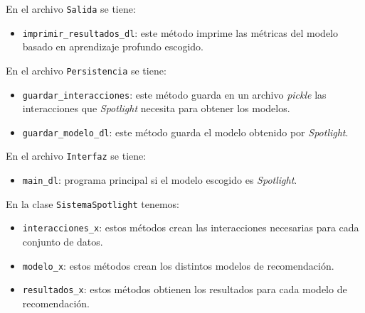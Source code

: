 En el archivo \texttt{Salida} se tiene:
\begin{itemize}
\tightlist
\item \texttt{imprimir\_resultados\_dl}: este método imprime las métricas del modelo basado en aprendizaje profundo escogido.
\end{itemize}

En el archivo \texttt{Persistencia} se tiene:
\begin{itemize}
\tightlist
\item \texttt{guardar\_interacciones}: este método guarda en un archivo \textit{pickle} las interacciones que \textit{Spotlight} necesita para obtener los modelos.
\item \texttt{guardar\_modelo\_dl}: este método guarda el modelo obtenido por \textit{Spotlight}.
\end{itemize}

En el archivo \texttt{Interfaz} se tiene:
\begin{itemize}
\tightlist 
\item \texttt{main\_dl}: programa principal si el modelo escogido es \textit{Spotlight}. 
\end{itemize}

En la clase \texttt{SistemaSpotlight} tenemos:
\begin{itemize}
\tightlist
\item \texttt{interacciones\_x}: estos métodos crean las interacciones necesarias para cada conjunto de datos. 
\item \texttt{modelo\_x}: estos métodos crean los distintos modelos de recomendación. 
\item \texttt{resultados\_x}: estos métodos obtienen los resultados para cada modelo de recomendación. 
\end{itemize}

